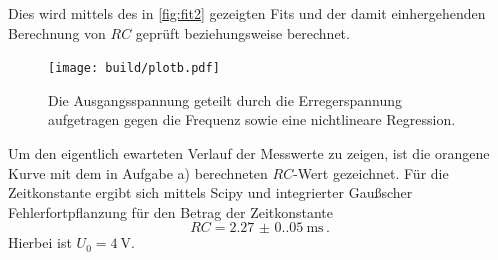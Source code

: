 Dies wird mittels des in \autoref{fig:fit2} gezeigten Fits und der damit einhergehenden Berechnung von $RC$
geprüft beziehungsweise berechnet.
\begin{figure}[H]
    \centering
    \texttt{[image: build/plotb.pdf]}
    \caption{Die Ausgangsspannung geteilt durch die Erregerspannung aufgetragen gegen die Frequenz
    sowie eine nichtlineare Regression.}
    \label{fig:fit2}
\end{figure}\noindent
Um den eigentlich ewarteten Verlauf der Messwerte zu zeigen, ist die orangene Kurve mit dem in Aufgabe 
a) berechneten $RC$-Wert gezeichnet.
Für die Zeitkonstante ergibt sich mittels Scipy und integrierter Gaußscher Fehlerfortpflanzung für den 
Betrag der Zeitkonstante
\begin{equation}
    RC=\qty{2.27(0.05)}{\milli\second}\,.
\end{equation}
Hierbei ist $U_0=\qty{4}{\volt}$. 
